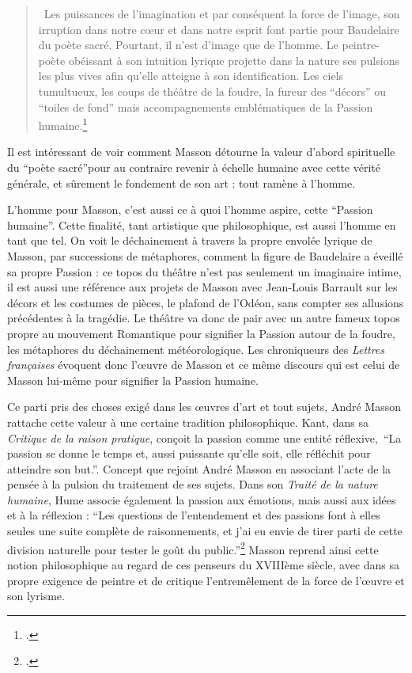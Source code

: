 \begin{quote}
 Les puissances de l’imagination et par conséquent la force de l’image, son irruption dans notre c\oe{}ur et dans notre esprit font partie pour Baudelaire du poète sacré. Pourtant, il n’est d’image que de l’homme. Le peintre-poète obéissant à son intuition lyrique projette dans la nature ses pulsions les plus vives afin qu’elle atteigne à son identification. Les ciels tumultueux, les coups de théâtre de la foudre, la fureur des \enquote{décors} ou \enquote{toiles de fond} mais accompagnements emblématiques de la Passion humaine.\footcite{baudelairepeintres}\end{quote}
 
 Il est intéressant de voir comment Masson détourne la valeur d’abord spirituelle du \enquote{poète sacré}pour au contraire revenir à échelle humaine avec cette vérité générale, et sûrement le fondement de son art : tout ramène à l’homme. 

	L’homme pour Masson, c’est aussi ce à quoi l’homme aspire, cette \enquote{Passion humaine}. Cette finalité, tant artistique que philosophique, est aussi l’homme en tant que tel. On voit le déchainement à travers la propre envolée lyrique de Masson, par successions de métaphores, comment la figure de Baudelaire a éveillé sa propre Passion : ce topos du théâtre n’est pas seulement un imaginaire intime, il est aussi une référence aux projets de Masson avec Jean-Louis Barrault sur les décors et les costumes de pièces, le plafond de l’Odéon, sans compter ses allusions précédentes à la tragédie. Le théâtre va donc de pair avec un autre fameux topos propre au mouvement Romantique pour signifier la Passion autour de la foudre, les métaphores du déchainement météorologique. Les chroniqueurs des \emph{Lettres françaises} évoquent donc l’\oe{}uvre de Masson et ce même discours qui est celui de Masson lui-même pour signifier la Passion humaine. 

Ce parti pris des choses exigé dans les \oe{}uvres d’art et tout sujets, André Masson rattache cette valeur à une certaine tradition philosophique. Kant, dans sa \emph{Critique de la raison pratique}, conçoit la passion comme une entité réflexive, \enquote{La passion se donne le temps et, aussi puissante qu’elle soit, elle réfléchit pour atteindre son but.}. Concept que rejoint André Masson en associant l’acte de la pensée à la pulsion du traitement de ses sujets. Dans son \emph{Traité de la nature humaine}, Hume associe également la passion aux émotions, mais aussi aux idées et à la réflexion : \enquote{Les questions de l'entendement et des passions font à elles seules une suite complète de raisonnements, et j'ai eu envie de tirer parti de cette division naturelle pour tester le goût du public.}\footcite{hume}  Masson reprend ainsi cette notion philosophique au regard de ces penseurs du XVIIIème siècle, avec dans sa propre exigence de peintre et de critique l’entremêlement de la force de l’\oe{}uvre et son lyrisme. 

